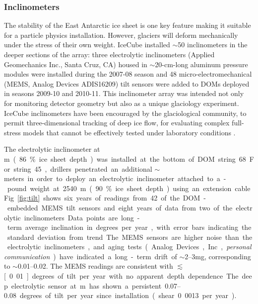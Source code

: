 \subsubsection{Inclinometers}  

The stability of the East Antarctic ice sheet is one key feature making it suitable for a particle physics installation.  However, glaciers will deform mechanically under the stress of their own weight.  IceCube installed $\sim$50 inclinometers in the deeper sections of the array:  three electrolytic inclinometers (Applied Geomechanics Inc., Santa Cruz, CA) housed in $\sim$20-cm-long aluminum pressure modules were installed during the 2007-08 season and 48 micro-electromechanical (MEMS, Analog Devices ADIS16209) tilt sensors were added to DOMs deployed in seasons 2009-10 and 2010-11.  This inclinometer array was intended not only for monitoring detector geometry but also as a unique glaciology experiment.  IceCube inclinometers have been encouraged by the glaciological community, to permit three-dimensional tracking of deep ice flow, for evaluating complex full-stress models that cannot be effectively tested under laboratory conditions \cite{pattyn03}.

The electrolytic inclinometer at \unit[2455]m (86\% ice sheet depth) was installed at the bottom of DOM string 68.  For string 45, drillers penetrated an additional $\sim$\unit[100]meters in order to deploy an electrolytic inclinometer attached to a \unit[100]-pound weight at 2540 m (90\% ice sheet depth) using an extension cable.  Fig.~\ref{fig:tilt} shows six years of readings from 42 of the DOM-embedded MEMS tilt sensors and eight years of data from two of the electrolytic inclinometers.  Data points are long-term average inclination in degrees per year, with error bars indicating the standard deviation from trend.  The MEMS sensors are higher noise than the electrolytic inclinometers, and aging tests (Analog Devices, Inc., {\it personal communication}) have indicated a long-term drift of $\sim$\numrange[range-phrase = --]{2}{3}mg, corresponding to $\sim$\numrange[range-phrase = --]{0.01}{0.02}.  The MEMS readings are consistent with $\lesssim$\unit[0.01]degrees of tilt per year with no apparent depth dependence.  The deep electrolytic sensor at \unit[2540]m has shown a persistent \numrange[range-phrase = --]{0.07}{0.08} degrees of tilt per year since installation (shear 0.0013 per year).

